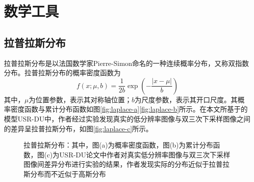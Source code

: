 \section{数学工具}
\subsection{拉普拉斯分布}
拉普拉斯分布是以法国数学家Pierre-Simon命名的一种连续概率分布，又称双指数分布。拉普拉斯分布的概率密度函数为
\begin{equation}
    f(x;\mu, b)=\frac{1}{2b}\exp(-\frac{|x-\mu|}{b})
\end{equation}
其中，$\mu$为位置参数，表示其对称轴位置；$b$为尺度参数，表示其开口尺度。其概率密度函数与累计分布函数如图\ref{fig:laplace-a}\ref{fig:laplace-b}所示。在本文所基于的模型USR-DU中，作者经过实验发现真实的低分辨率图像与双三次下采样图像之间的差异呈拉普拉斯分布，如图\ref{fig:laplace-c}所示。
\begin{figure}[h]
    \hfill
    \hfill
    \caption{拉普拉斯分布：其中，图(a)为概率密度函数，图(b)为累计分布函数，图(c)为USR-DU论文中作者对真实低分辨率图像与双三次下采样图像间差异分布进行实验的结果，作者发现实际的分布近似于拉普拉斯分布而不近似于高斯分布}	
    \label{fig:laplace}
\end{figure}

